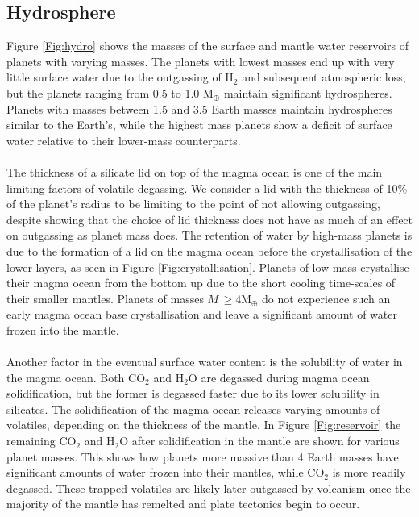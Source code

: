 \documentclass[bibyear,tradiabstract]{aa}
\begin{document}
\subsection{Hydrosphere}
Figure \ref{Fig:hydro} shows the masses of the surface and mantle water reservoirs of planets with varying masses. The planets with lowest masses end up with very little surface water due to the outgassing of H$_2$ and subsequent atmospheric loss, but the planets ranging from 0.5 to 1.0 M$_{\oplus}$ maintain significant hydrospheres. Planets with masses between 1.5 and 3.5 Earth masses maintain hydrospheres similar to the Earth's, while the highest mass planets show a deficit of surface water relative to their lower-mass counterparts. \\
\\
The thickness of a silicate lid on top of the magma ocean is one of the main limiting factors of volatile degassing. We consider a lid with the thickness of 10\% of the planet's radius to be limiting to the point of not allowing outgassing{, despite \cite{Dorn+2018} showing that the choice of lid thickness does not have as much of an effect on outgassing as planet mass does}. The retention of water by high-mass planets is due to the formation of a lid on the magma ocean before the crystallisation of the lower layers, as seen in Figure \ref{Fig:crystallisation}. Planets of low mass crystallise their magma ocean from the bottom up due to the short cooling time-scales of their smaller mantles. Planets of masses $M$\,$\geq 4$M$_{\oplus}$ do not experience such an early magma ocean base crystallisation and leave a significant amount of water frozen into the mantle.\\   
\\
Another factor in the eventual surface water content is the solubility of water in the magma ocean. Both CO$_2$ and H$_2$O are degassed during magma ocean solidification, but the former is degassed faster due to its lower solubility in silicates. The solidification of the magma ocean releases varying amounts of volatiles, depending on the thickness of the mantle. In Figure \ref{Fig:reservoir} the remaining CO$_2$ and H$_2$O after solidification in the mantle are shown for various planet masses. This shows how planets more massive than 4 Earth masses have significant amounts of water frozen into their mantles, while CO$_2$ is more readily degassed. These trapped volatiles are likely later outgassed by volcanism once the majority of the mantle has remelted and plate tectonics begin to occur.
\end{document}
